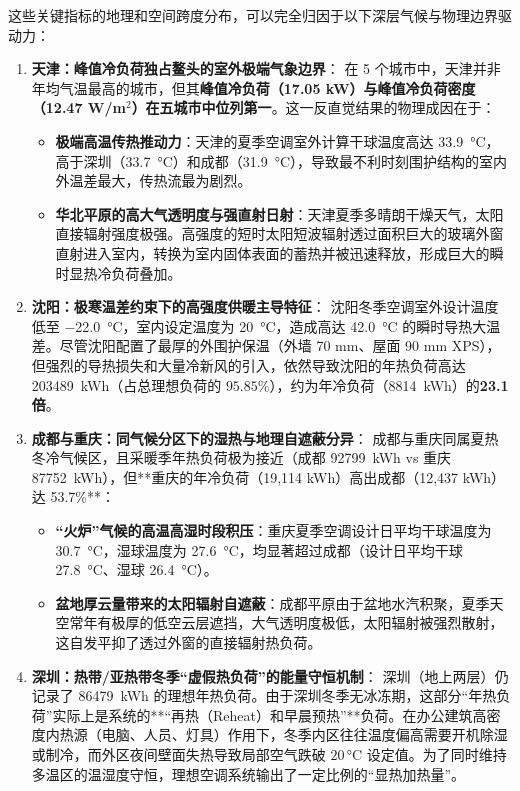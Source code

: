 \documentclass[11pt,a4paper]{article}
\begin{document}
这些关键指标的地理和空间跨度分布，可以完全归因于以下深层气候与物理边界驱动力：

\begin{enumerate}
    \item \textbf{天津：峰值冷负荷独占鳌头的室外极端气象边界}：
    在 5 个城市中，天津并非年均气温最高的城市，但其\textbf{峰值冷负荷（17.05 kW）与峰值冷负荷密度（12.47 W/m$^2$）在五城市中位列第一}。这一反直觉结果的物理成因在于：
    \begin{itemize}
        \item \textbf{极端高温传热推动力}：天津的夏季空调室外计算干球温度高达 \SI{33.9}{\degreeCelsius}，高于深圳（\SI{33.7}{\degreeCelsius}）和成都（\SI{31.9}{\degreeCelsius}），导致最不利时刻围护结构的室内外温差最大，传热流最为剧烈。
        \item \textbf{华北平原的高大气透明度与强直射日射}：天津夏季多晴朗干燥天气，太阳直接辐射强度极强。高强度的短时太阳短波辐射透过面积巨大的玻璃外窗直射进入室内，转换为室内固体表面的蓄热并被迅速释放，形成巨大的瞬时显热冷负荷叠加。
    \end{itemize}
    
    \item \textbf{沈阳：极寒温差约束下的高强度供暖主导特征}：
    沈阳冬季空调室外设计温度低至 \SI{-22.0}{\degreeCelsius}，室内设定温度为 \SI{20}{\degreeCelsius}，造成高达 \SI{42.0}{\degreeCelsius} 的瞬时导热大温差。尽管沈阳配置了最厚的外围护保温（外墙 70 mm、屋面 90 mm XPS），但强烈的导热损失和大量冷新风的引入，依然导致沈阳的年热负荷高达 \SI{203489}{kWh}（占总理想负荷的 $95.85\%$），约为年冷负荷（\SI{8814}{kWh}）的\textbf{23.1倍}。
    
    \item \textbf{成都与重庆：同气候分区下的湿热与地理自遮蔽分异}：
    成都与重庆同属夏热冬冷气候区，且采暖季年热负荷极为接近（成都 \SI{92799}{kWh} vs 重庆 \SI{87752}{kWh}），但**重庆的年冷负荷（19,114 kWh）高出成都（12,437 kWh）达 53.7\%**：
    \begin{itemize}
        \item \textbf{“火炉”气候的高温高湿时段积压}：重庆夏季空调设计日平均干球温度为 \SI{30.7}{\degreeCelsius}，湿球温度为 \SI{27.6}{\degreeCelsius}，均显著超过成都（设计日平均干球 \SI{27.8}{\degreeCelsius}、湿球 \SI{26.4}{\degreeCelsius}）。
        \item \textbf{盆地厚云量带来的太阳辐射自遮蔽}：成都平原由于盆地水汽积聚，夏季天空常年有极厚的低空云层遮挡，大气透明度极低，太阳辐射被强烈散射，这自发平抑了透过外窗的直接辐射热负荷。
    \end{itemize}
    
    \item \textbf{深圳：热带/亚热带冬季“虚假热负荷”的能量守恒机制}：
    深圳（地上两层）仍记录了 \SI{86479}{kWh} 的理想年热负荷。由于深圳冬季无冰冻期，这部分“年热负荷”实际上是系统的**“再热（Reheat）和早晨预热”**负荷。在办公建筑高密度内热源（电脑、人员、灯具）作用下，冬季内区往往温度偏高需要开机除湿或制冷，而外区夜间壁面失热导致局部空气跌破 $20\,\si{\degreeCelsius}$ 设定值。为了同时维持多温区的温湿度守恒，理想空调系统输出了一定比例的“显热加热量”。
\end{enumerate}
\end{document}
